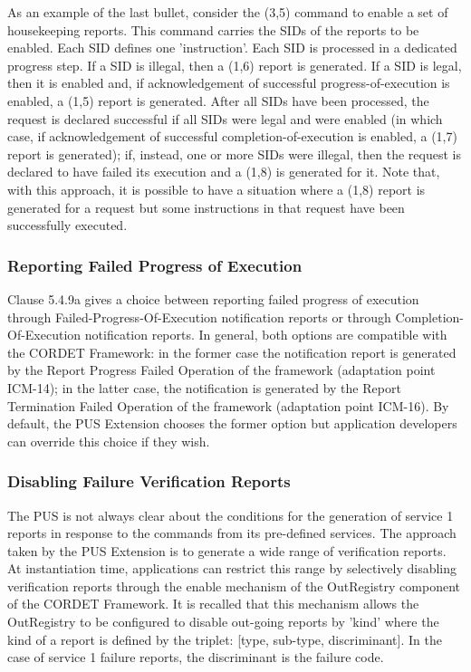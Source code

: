 \documentclass{pnp_article}
\begin{document}
As an example of the last bullet, consider the (3,5) command to enable a set of housekeeping reports. This command carries the SIDs of the reports to be enabled. Each SID defines one 'instruction'. Each SID is processed in a dedicated progress step. If a SID is illegal, then a (1,6) report is generated. If a SID is legal, then it is enabled and, if acknowledgement of successful progress-of-execution is enabled, a (1,5) report is generated. After all SIDs have been processed, the request is declared successful if all SIDs were legal and were enabled (in which case, if acknowledgement of successful completion-of-execution is enabled, a (1,7) report is generated); if, instead, one or more SIDs were illegal, then the request is declared to have failed its execution and a (1,8) is generated for it. Note that, with this approach, it is possible to have a situation where a (1,8) report is generated for a request but some instructions in that request have been successfully executed. 

\subsubsection{Reporting Failed Progress of Execution}
Clause 5.4.9a gives a choice between reporting failed progress of execution through Failed-Progress-Of-Execution notification reports or through Completion-Of-Execution notification reports. In general, both options are compatible with the CORDET Framework: in the former case the notification report is generated by the Report Progress Failed Operation of the framework (adaptation point ICM-14); in the latter case, the notification is generated by the Report Termination Failed Operation of the framework (adaptation point ICM-16). By default, the PUS Extension chooses the former option but application developers can override this choice if they wish.

\subsubsection{Disabling Failure Verification Reports} 
The PUS is not always clear about the conditions for the generation of service 1 reports in response to the commands from its pre-defined services. The approach taken by the PUS Extension is to generate a wide range of verification reports. At instantiation time, applications can restrict this range by selectively disabling verification reports through the enable mechanism of the OutRegistry component of the CORDET Framework. It is recalled that this mechanism allows the OutRegistry to be configured to disable out-going reports by 'kind' where the kind of a report is defined by the triplet: [type, sub-type, discriminant]. In the case of service 1 failure reports, the discriminant is the failure code. 
 
\end{document}
